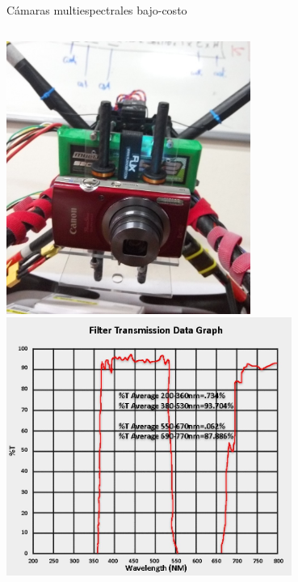 \documentclass{beamer}
\begin{document}
\begin{frame}{Cámaras multiespectrales bajo-costo}
	\begin{columns}
		\centering
		\includegraphics[width=0.6\textwidth]{IMGs/camara_UAV}\\
		\includegraphics[width=0.7\textwidth]{IMGs/filtro_UAV}

\end{columns}
\end{frame}
\end{document}
